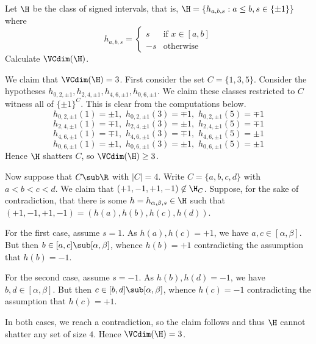 \documentclass[12pt]{article}
\begin{document}
\begin{homeworkProblem}
  Let $ \H $ be the class of signed intervals, that is, $ \H = \{h_{a,b,s}:a\leq b, s\in \{\pm 1\}\} $ where
  \[
    h_{a,b,s} = 
    \begin{cases}
      s & \text{if }x\in[a,b] \\
      -s & \text{otherwise}
    \end{cases}
  \]
  Calculate $ \VCdim(\H) $.
\end{homeworkProblem}

\begin{solution}
  We claim that $ \VCdim(\H) = 3 $. First consider the set $ C = \{1,3,5\} $. Consider the hypotheses $ h_{0,2,\pm1}, h_{2,4,\pm1}, h_{4,6,\pm1},h_{0,6,\pm1}$. We claim these classes restricted to $ C $ witness all of $ \{\pm 1\}^{C} $. This is clear from the computations below.
  \[
    h_{0,2,\pm1}(1) = \pm1,\,\, h_{0,2,\pm1}(3)=\mp1,\,\, h_{0,2,\pm1}(5)=\mp1
  \]
  \[
    h_{2,4,\pm1}(1) = \mp1,\,\, h_{2,4,\pm1}(3)=\pm1,\,\, h_{2,4,\pm1}(5)=\mp1
  \]
  \[
    h_{4,6,\pm1}(1) = \mp1,\,\, h_{4,6,\pm1}(3)=\mp1,\,\, h_{4,6,\pm1}(5)=\pm1
  \]
  \[
    h_{0,6,\pm1}(1) = \pm1,\,\, h_{0,6,\pm1}(3)=\pm1,\,\, h_{0,6,\pm1}(5)=\pm1
  \]
  Hence $ \H $ shatters $ C $, so $ \VCdim(\H) \geq 3 $.

  Now suppose that $ C\sub \R $ with $ |C| = 4 $. Write $ C = \{a,b,c,d\} $ with $ a<b<c<d $. We claim that $ (+1,-1,+1,-1)\not\in\H_{C}  $. Suppose, for the sake of contradiction, that there is some $ h = h_{\alpha,\beta,s}\in \H $ such that $ (+1,-1,+1,-1) = (h(a), h(b), h(c), h(d)) $. 
  
  For the first case, assume $ s=1 $. As $ h(a),h(c) = +1 $, we have $ a,c\in [\alpha,\beta] $. But then $ b\in [a,c]\sub [\alpha,\beta] $, whence $ h(b) = +1 $ contradicting the assumption that $ h(b) = -1 $. 

  For the second case, assume $ s=-1 $. As $ h(b),h(d) = -1 $, we have $ b,d\in [\alpha,\beta] $. But then $ c\in[b,d]\sub [\alpha,\beta] $, whence $ h(c) = -1 $ contradicting the assumption that $ h(c) = +1 $.

  In both cases, we reach a contradiction, so the claim follows and thus $ \H $ cannot shatter any set of size $ 4 $. Hence $ \VCdim(\H) = 3 $.


\end{solution}
\end{document}
